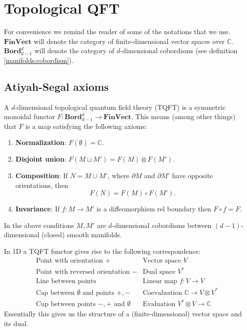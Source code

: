 \section{Topological QFT}

    For convenience we remind the reader of some of the notations that we use. $\mathbf{FinVect}$ will denote the category of finite-dimensional vector spaces over $\mathbb{C}$. $\mathbf{Bord}^d_{d-1}$ will denote the category of $d$-dimensional cobordisms (see definition \ref{manifolds:cobordism}).

\subsection{Atiyah-Segal axioms}

    \begin{axiom}
        A $d$-dimensional topological quantum field theory (TQFT) is a symmetric monoidal functor $F:\textbf{Bord}_{d-1}^d\rightarrow\textbf{FinVect}$. This means (among other things) that $F$ is a map satisfying the following axioms:
        \begin{enumerate}
            \item \textbf{Normalization}: $F(\emptyset)=\mathbb{C}$.
            \item \textbf{Disjoint union}: $F(M\sqcup M') = F(M)\otimes F(M')$.
            \item \textbf{Composition}: If $N=M\cup M'$, where $\partial M$ and $\partial M'$ have opposite orientations, then \[F(N) = F(M)\circ F(M').\]
            \item \textbf{Invariance}: If $f: M\rightarrow M'$ is a diffeomorphism rel boundary then $F\circ f = F$.
        \end{enumerate}
        In the above conditions $M, M'$ are $d$-dimensional cobordisms between $(d-1)$-dimensional (closed) smooth manifolds.
    \end{axiom}

    \begin{example}[1D]
        In 1D a TQFT functor gives rise to the following correspondence:
        \begin{equation*}
            \begin{array}{l|l}
                \text{Point with orientation } + & \text{Vector space } V\\
                \text{Point with reversed orientation } - & \text{Dual space } V^*\\
                \text{Line between points} & \text{Linear map } f:V\rightarrow V\\
                \text{Cap between $\emptyset$ and points } +, - & \text{Coevaluation } \mathbb{C}\rightarrow V\otimes V^*\\
                \text{Cup between points $-, +$ and }\emptyset & \text{Evaluation } V^*\otimes V\rightarrow\mathbb{C}
            \end{array}
        \end{equation*}
        Essentially this gives us the structure of a (finite-dimensional) vector space and its dual.
    \end{example}

